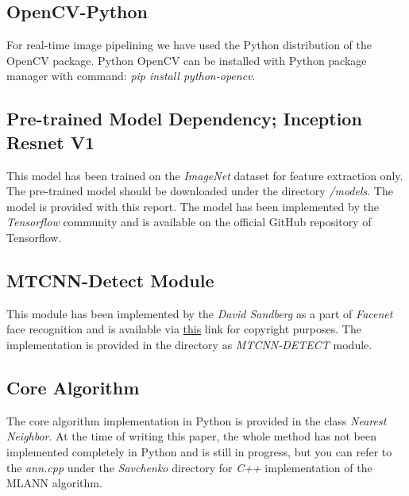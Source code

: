 \subsection{OpenCV-Python}
For real-time image pipelining we have used the Python distribution of the OpenCV package. Python OpenCV can be installed with Python package manager with command: \textit{pip install python-opencv}.

\subsection{Pre-trained Model Dependency; Inception Resnet V1}
This model has been trained on the \textit{ImageNet} dataset for feature extraction only. The pre-trained model should be downloaded under the directory \textit{/models}. The model is provided with this report. The model has been implemented by the \textit{Tensorflow} community and is available on the official GitHub repository of Tensorflow.

\subsection{MTCNN-Detect Module}
This module has been implemented by the \textit{David Sandberg} as a part of \textit{Facenet} face recognition and is available via \href{https://github.com/davidsandberg/facenet}{this} link for copyright purposes. The implementation is provided in the directory as \textit{MTCNN-DETECT} module.

\subsection{Core Algorithm}
The core algorithm implementation in Python is provided in the class \textit{Nearest Neighbor}. At the time of writing this paper, the whole method has not been implemented completely in Python and is still in progress, but you can refer to the \textit{ann.cpp} under the \textit{Savchenko} directory for \textit{C++} implementation of the MLANN algorithm.